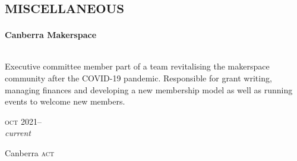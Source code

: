 

\section*{\textsc{miscellaneous}}
\vspace{-0.2cm}

\begin{minipage}[t]{\mainboxwidth\textwidth}
\textbf{Canberra Makerspace}\\
\\
{\small
Executive committee member part of a team revitalising the makerspace community after the COVID-19 pandemic. Responsible for grant writing, managing finances and developing a new membership model as well as running events to welcome new members.
\par}
\end{minipage}
\begin{minipage}[t]{\detailboxwidth\textwidth}
{
\hfill \textsc{oct} 2021--\\ 
\hspace*{0pt} \hfill \textit{\small current}
\par
{\small\hfill \footnotesize{Canberra} \textsc{act}}
}
\end{minipage}
\\


